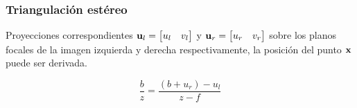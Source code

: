 \documentclass[compress]{beamer}
\begin{document}
\begin{frame}
\frametitle{Triangulación estéreo}

Proyecciones correspondientes $\boldsymbol{\mathbf{u}}_{l}=\begin{bmatrix}u_{l} & v_{l}\end{bmatrix}$ y $\boldsymbol{\mathbf{u}}_{r}=\begin{bmatrix}u_{r} & v_{r}\end{bmatrix}$ sobre los planos focales de la imagen izquierda y derecha respectivamente,
la posición del punto $\boldsymbol{\mathbf{x}}$ puede ser derivada.

\begin{equation}
\frac{b}{z}=\frac{(b+u_{r})-u_{l}}{z-f}
\end{equation}

\begin{figure}[!htb]
	\centering
	\hfill
	\centering
	\hfill
\end{figure}
\end{frame}
\end{document}
